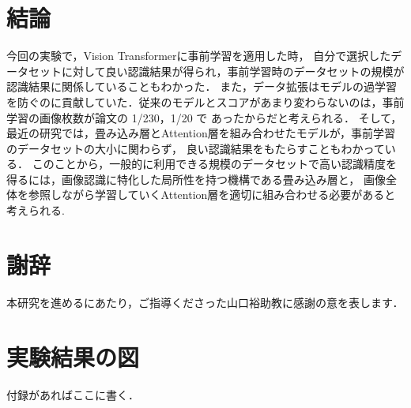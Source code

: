 \documentclass[a4paper, oneside, openany, dvipdfmx]{suribt}%
\begin{document}
\chapter{結論}
今回の実験で，Vision Transformerに事前学習を適用した時，
自分で選択したデータセットに対して良い認識結果が得られ，事前学習時のデータセットの規模が認識結果に関係していることもわかった．
また，データ拡張はモデルの過学習を防ぐのに貢献していた．従来のモデルとスコアがあまり変わらないのは，事前学習の画像枚数が論文の 1/230，1/20 で あったからだと考えられる．
そして，最近の研究では，畳み込み層とAttention層を組み合わせたモデルが，事前学習のデータセットの大小に関わらず， 良い認識結果をもたらすこともわかっている\cite{dai2021coatnet}．
このことから，一般的に利用できる規模のデータセットで高い認識精度を得るには，画像認識に特化した局所性を持つ機構である畳み込み層と，
画像全体を参照しながら学習していくAttention層を適切に組み合わせる必要があると考えられる.

\backmatter%
\chapter{謝辞}%
本研究を進めるにあたり，ご指導くださった山口裕助教に感謝の意を表します．


\appendix%
\chapter{実験結果の図}
付録があればここに書く．
\end{document}
